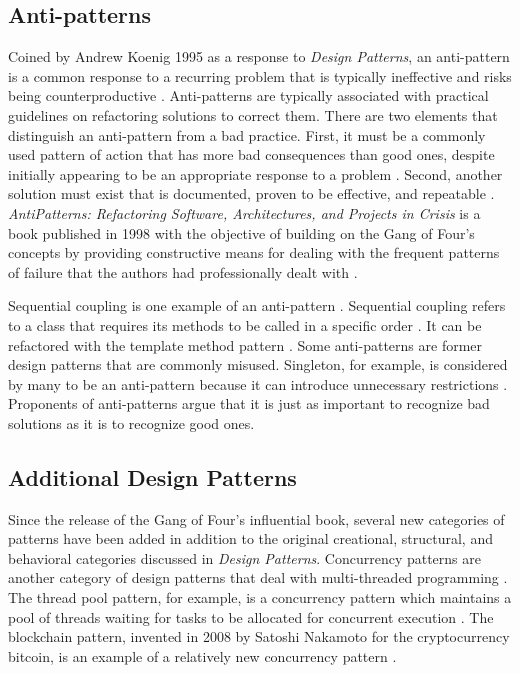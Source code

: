 \documentclass[11pt]{article}
\begin{document}
\subsection{Anti-patterns}

Coined by Andrew Koenig 1995 as a response to \textit{Design Patterns}, an anti-pattern is a common response to a recurring problem that is typically ineffective and risks being counterproductive \cite{doty}. Anti-patterns are typically associated with practical guidelines on refactoring solutions to correct them. There are two elements that distinguish an anti-pattern from a bad practice. First, it must be a commonly used pattern of action that has more bad consequences than good ones, despite initially appearing to be an appropriate response to a problem \cite{rising1998}. Second, another solution must exist that is documented, proven to be effective, and repeatable \cite{rising1998}. \textit{AntiPatterns: Refactoring Software, Architectures, and Projects in Crisis} is a book published in 1998 with the objective of building on the Gang of Four's concepts by providing constructive means for dealing with the frequent patterns of failure that the authors had professionally dealt with \cite{brown1998}. 

Sequential coupling is one example of an anti-pattern \cite{rising1998}. Sequential coupling refers to a class that requires its methods to be called in a specific order \cite{rising1998}. It can be refactored with the template method pattern \cite{rising1998}. Some anti-patterns are former design patterns that are commonly misused. Singleton, for example, is considered by many to be an anti-pattern because it can introduce unnecessary restrictions \cite{densmore2004}. Proponents of anti-patterns argue that it is just as important to recognize bad solutions as it is to recognize good ones.

\subsection{Additional Design Patterns}

Since the release of the Gang of Four's influential book, several new categories of patterns have been added in addition to the original creational, structural, and behavioral categories discussed in \textit{Design Patterns}. Concurrency patterns are another category of design patterns that deal with multi-threaded programming \cite{sanden1997}. The thread pool pattern, for example, is a concurrency pattern which maintains a pool of threads waiting for tasks to be allocated for concurrent execution \cite{sanden1997}. The blockchain pattern, invented in 2008 by Satoshi Nakamoto for the cryptocurrency bitcoin, is an example of a relatively new concurrency pattern \cite{economist_2015}. 
\end{document}

